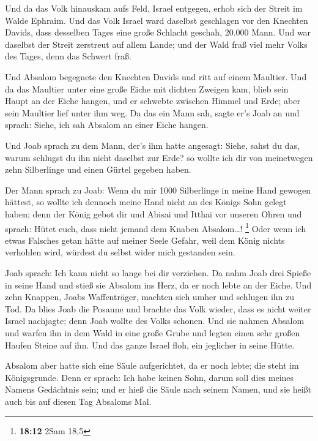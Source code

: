  Und da das Volk hinauskam aufs Feld, Israel entgegen,
erhob sich der Streit im Walde Ephraim.  Und das Volk
Israel ward daselbst geschlagen vor den Knechten Davids, dass desselben
Tages eine große Schlacht geschah, 20.000 Mann.  Und war
daselbst der Streit zerstreut auf allem Lande; und der Wald fraß viel
mehr Volks des Tages, denn das Schwert fraß.

 Und Absalom begegnete den Knechten Davids und ritt auf
einem Maultier. Und da das Maultier unter eine große Eiche mit dichten
Zweigen kam, blieb sein Haupt an der Eiche hangen, und er schwebte
zwischen Himmel und Erde; aber sein Maultier lief unter ihm weg.
 Da das ein Mann sah, sagte er's Joab an und sprach:
Siehe, ich sah Absalom an einer Eiche hangen.

 Und Joab sprach zu dem Mann, der's ihm hatte angesagt:
Siehe, sahst du das, warum schlugst du ihn nicht daselbst zur Erde? so
wollte ich dir von meinetwegen zehn Silberlinge und einen Gürtel gegeben
haben.

 Der Mann sprach zu Joab: Wenn du mir 1000 Silberlinge in
meine Hand gewogen hättest, so wollte ich dennoch meine Hand nicht an
des Königs Sohn gelegt haben; denn der König gebot dir und Abisai und
Itthai vor unseren Ohren und sprach: Hütet euch, dass nicht jemand dem
Knaben Absalom\ldots! \footnote{\textbf{18:12} 2Sam 18,5}
 Oder wenn ich etwas Falsches getan hätte auf meiner
Seele Gefahr, weil dem König nichts verhohlen wird, würdest du selbst
wider mich gestanden sein.

 Joab sprach: Ich kann nicht so lange bei dir verziehen.
Da nahm Joab drei Spieße in seine Hand und stieß sie Absalom ins Herz,
da er noch lebte an der Eiche.  Und zehn Knappen, Joabs
Waffenträger, machten sich umher und schlugen ihn zu Tod.
 Da blies Joab die Posaune und brachte das Volk wieder,
dass es nicht weiter Israel nachjagte; denn Joab wollte des Volks
schonen.  Und sie nahmen Absalom und warfen ihn in dem
Wald in eine große Grube und legten einen sehr großen Haufen Steine auf
ihn. Und das ganze Israel floh, ein jeglicher in seine Hütte.

 Absalom aber hatte sich eine Säule aufgerichtet, da er
noch lebte; die steht im Königsgrunde. Denn er sprach: Ich habe keinen
Sohn, darum soll dies meines Namens Gedächtnis sein; und er hieß die
Säule nach seinem Namen, und sie heißt auch bis auf diesen Tag Absaloms
Mal.


